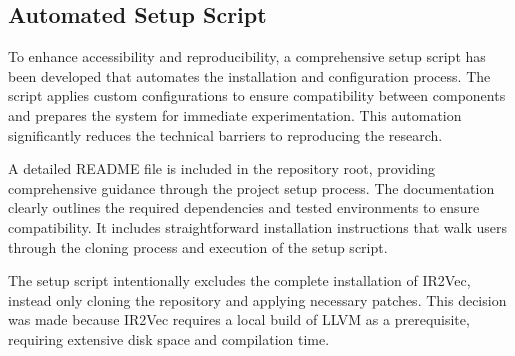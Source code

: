\subsection{Automated Setup Script}
To enhance accessibility and reproducibility, a comprehensive setup script has been developed that automates the installation and configuration process. The script applies custom configurations to ensure compatibility between components and prepares the system for immediate experimentation. This automation significantly reduces the technical barriers to reproducing the research.

A detailed README file is included in the repository root, providing comprehensive guidance through the project setup process. The documentation clearly outlines the required dependencies and tested environments to ensure compatibility. It includes straightforward installation instructions that walk users through the cloning process and execution of the setup script.

The setup script intentionally excludes the complete installation of IR2Vec, instead only cloning the repository and applying necessary patches. This decision was made because IR2Vec requires a local build of LLVM as a prerequisite, requiring extensive disk space and compilation time.













